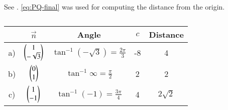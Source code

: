   See .
			\eqref{eq:PQ-final} was used for computing the distance from the origin.
			\begin{table}[H]
  \centering
  \begin{tabular}{|c|c|c|c|c|}
    \hline
    & $\vec{n}$ & Angle & $c$& Distance \\
    \hline
    a) & $\begin{pmatrix}1 \\ -\sqrt{3}\end{pmatrix}$ & $\tan^{-1}(-\sqrt{3}) = \frac{2\pi}{3}$ &-8 & 4 \\
    \hline
    b) & $\begin{pmatrix}0 \\ 1\end{pmatrix}$ & $\tan^{-1}\infty = \frac{\pi}{2}$ &2 & 2 \\
    \hline
    c) & $\begin{pmatrix}1 \\ -1\end{pmatrix}$ & $\tan^{-1}(-1) = \frac{3\pi}{4}$ &4 & $2\sqrt{2}$ \\
    \hline
  \end{tabular}
  \caption{}
  \label{tab:11/10/3/3}
\end{table}

